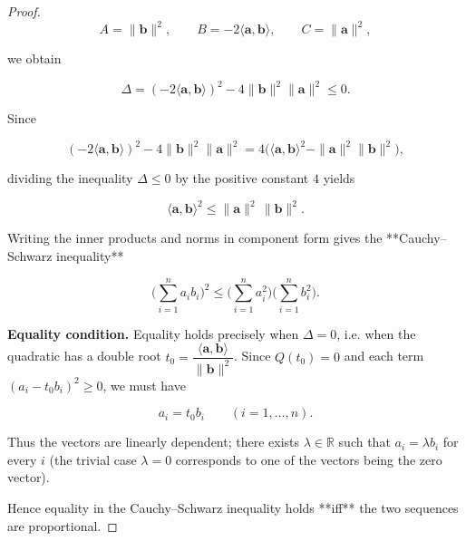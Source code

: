 \begin{proof}
\[
A=\|\mathbf b\|^{2},\qquad B=-2\langle\mathbf a,\mathbf b\rangle,\qquad 
C=\|\mathbf a\|^{2},
\]

we obtain  

\[
\Delta =(-2\langle\mathbf a,\mathbf b\rangle)^{2}
        -4\|\mathbf b\|^{2}\|\mathbf a\|^{2}
      \le0 .
\]

Since  

\[
(-2\langle\mathbf a,\mathbf b\rangle)^{2}
-4\|\mathbf b\|^{2}\|\mathbf a\|^{2}
=4\bigl(\langle\mathbf a,\mathbf b\rangle^{2}
        -\|\mathbf a\|^{2}\|\mathbf b\|^{2}\bigr),
\]

dividing the inequality \(\Delta\le0\) by the positive constant \(4\) yields  

\[
\langle\mathbf a,\mathbf b\rangle^{2}\le\|\mathbf a\|^{2}\,\|\mathbf b\|^{2}.
\]

Writing the inner products and norms in component form gives the **Cauchy–Schwarz inequality**

\[
\boxed{\displaystyle
\biggl(\sum_{i=1}^{n}a_{i}b_{i}\biggr)^{2}
\le
\biggl(\sum_{i=1}^{n}a_{i}^{2}\biggr)
   \biggl(\sum_{i=1}^{n}b_{i}^{2}\biggr)}.
\]

\medskip\noindent\textbf{Equality condition.}  
Equality holds precisely when \(\Delta=0\), i.e. when the quadratic has a double root  
\(t_{0}= \dfrac{\langle\mathbf a,\mathbf b\rangle}{\|\mathbf b\|^{2}}\).  
Since \(Q(t_{0})=0\) and each term \((a_{i}-t_{0}b_{i})^{2}\ge0\), we must have  

\[
a_{i}=t_{0}b_{i}\qquad (i=1,\dots ,n).
\]

Thus the vectors are linearly dependent; there exists \(\lambda\in\mathbb R\) such that  
\(a_{i}= \lambda b_{i}\) for every \(i\) (the trivial case \(\lambda=0\) corresponds to one of the vectors being the zero vector).

Hence equality in the Cauchy–Schwarz inequality holds **iff** the two sequences are proportional.

\end{proof}